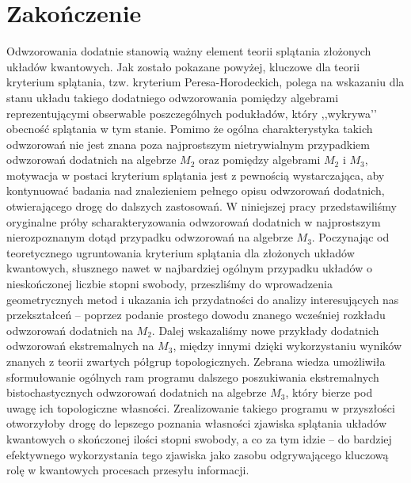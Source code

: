 \chapter*{Zakończenie}
    \label{chap:Zakończenie}

Odwzorowania dodatnie stanowią ważny element teorii splątania złożonych
układów kwantowych.
Jak zostało pokazane powyżej,
kluczowe dla teorii kryterium splątania,
tzw. kryterium Peresa-Horodeckich,
polega na wskazaniu dla stanu układu takiego
dodatniego odwzorowania pomiędzy algebrami reprezentującymi obserwable
poszczególnych podukładów, który ,,wykrywa’’ obecność splątania w tym stanie.
Pomimo że ogólna charakterystyka takich odwzorowań nie jest znana poza
najprostszym nietrywialnym przypadkiem odwzorowań dodatnich na algebrze
$M_{2}$ oraz pomiędzy algebrami $M_{2}$ i $M_{3}$, motywacja w postaci kryterium
splątania jest z pewnością wystarczająca,
aby kontynuować badania nad znalezieniem pełnego opisu odwzorowań dodatnich,
otwierającego drogę do dalszych zastosowań.
W niniejszej pracy przedstawiliśmy oryginalne próby scharakteryzowania
odwzorowań dodatnich w najprostszym nierozpoznanym dotąd przypadku odwzorowań
na algebrze $M_{3}$.
Poczynając od teoretycznego ugruntowania kryterium splątania dla złożonych
układów kwantowych,
słusznego nawet w najbardziej ogólnym przypadku układów
o nieskończonej liczbie stopni swobody,
przeszliśmy do wprowadzenia geometrycznych metod i ukazania ich przydatności do
analizy interesujących nas przekształceń --
poprzez podanie prostego dowodu znanego wcześniej rozkładu
odwzorowań dodatnich na $M_{2}$.
Dalej wskazaliśmy nowe przykłady dodatnich odwzorowań ekstremalnych na $M_{3}$,
między innymi dzięki wykorzystaniu wyników znanych
z teorii zwartych półgrup topologicznych.
Zebrana wiedza umożliwiła sformułowanie ogólnych ram programu dalszego
poszukiwania ekstremalnych bistochastycznych odwzorowań dodatnich
na algebrze $M_{3}$,
który bierze pod uwagę ich topologiczne własności.
Zrealizowanie takiego programu w przyszłości otworzyłoby drogę do lepszego
poznania własności zjawiska splątania układów kwantowych o skończonej ilości
stopni swobody,
a co za tym idzie -- do bardziej efektywnego wykorzystania tego zjawiska jako
zasobu odgrywającego kluczową rolę w kwantowych procesach przesyłu informacji.
